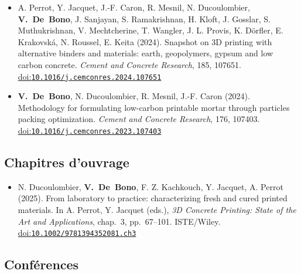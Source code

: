 \documentclass[11pt,a4paper]{article}
\newcommand{\doi}[1]{\href{https://doi.org/#1}{doi:\nolinkurl{#1}}}
\newcommand{\me}{\textbf{V.~De~Bono}}
\newenvironment{publis}[1]%
  {\begin{itemize}[label={}, leftmargin=1.2em, labelwidth=0pt, labelsep=0pt,
     itemindent=-1.2em, itemsep=0.45em, topsep=0.3em]}%
  {\end{itemize}}
\begin{document}
\begin{publis}{A}
  \item A. Perrot, Y. Jacquet, J.-F. Caron, R. Mesnil, N. Ducoulombier, \me, J. Sanjayan, S. Ramakrishnan, H. Kloft, J. Gosslar, S. Muthukrishnan, V. Mechtcherine, T. Wangler, J. L. Provis, K. Dörfler, E. Krakovská, N. Roussel, E. Keita (2024).
  Snapshot on 3D printing with alternative binders and materials: earth, geopolymers, gypsum and low carbon concrete.
  \emph{Cement and Concrete Research}, 185, 107651.
  \doi{10.1016/j.cemconres.2024.107651}

  \item \me, N. Ducoulombier, R. Mesnil, J.-F. Caron (2024).
  Methodology for formulating low-carbon printable mortar through particles packing optimization.
  \emph{Cement and Concrete Research}, 176, 107403.
  \doi{10.1016/j.cemconres.2023.107403}
\end{publis}

\subsection*{Chapitres d'ouvrage}

\begin{publis}{O}
  \item N. Ducoulombier, \me, F. Z. Kachkouch, Y. Jacquet, A. Perrot (2025).
  From laboratory to practice: characterizing fresh and cured printed materials.
  In A. Perrot, Y. Jacquet (eds.), \emph{3D Concrete Printing: State of the Art and Applications}, chap.~3, pp.~67--101. ISTE/Wiley.
  \doi{10.1002/9781394352081.ch3}

\end{publis}

\subsection*{Conférences}
\end{document}
